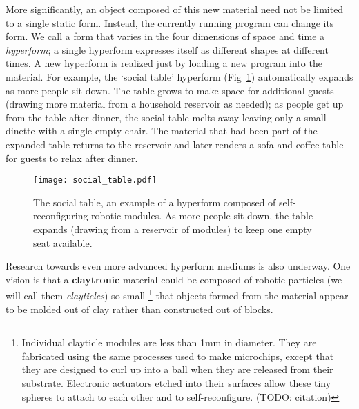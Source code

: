 More significantly, an object composed of this new material need not be limited to a single static form. 
Instead, the currently running program can change its form. 
We call a form that varies in the four dimensions of space and time a \emph{hyperform}; a single hyperform expresses itself as different shapes at different times.  
A new hyperform is realized just by loading a new program into the material. 
For example, the `social table' hyperform (Fig~\ref{fig:social_table}) automatically expands as more people sit down. 
The table grows to make space for additional guests (drawing more material from a household reservoir as needed); as people get up from the table after dinner, the social table melts away leaving only a small dinette with a single empty chair. 
The material that had been part of the expanded table returns to the reservoir and later renders a sofa and coffee table for guests to relax after dinner.

\begin{figure}[tb]
  \centering
    \texttt{[image: social\_table.pdf]}
  \caption{The social table, an example of a hyperform composed of self-reconfiguring robotic modules. As more people sit down, the table expands (drawing from a reservoir of modules) to keep one empty seat available.}
  \label{fig:social_table}
\end{figure}

Research towards even more advanced hyperform mediums is also underway. One vision is that a \textbf{claytronic} \citep{goldstein_computer2005} material could be composed of robotic particles (we will call them \emph{clayticles}) so small%
\footnote{Individual clayticle modules are less than 1mm in diameter. 
They are fabricated using the same processes used to make microchips, except that they are designed to curl up into a ball when they are released from their substrate.
Electronic actuators etched into their surfaces allow these tiny spheres to attach to each other and to self{}-reconfigure. (TODO: citation)}
that objects formed from the material appear to be molded out of clay rather than constructed out of blocks.

